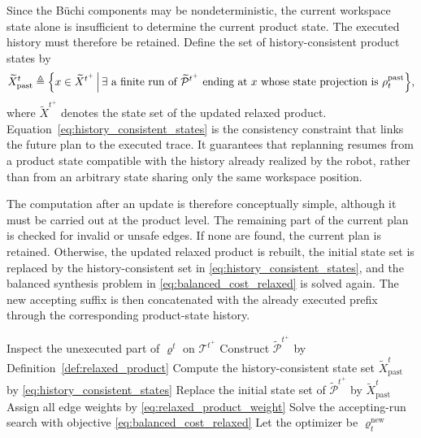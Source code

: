 Since the B\"uchi components may be nondeterministic, the current workspace
state alone is insufficient to determine the current product state. The
executed history must therefore be retained. Define the set of
history-consistent product states by
\begin{equation}
\widetilde{X}^{t}_{\mathrm{past}} \triangleq
\Bigl\{x \in \widetilde{X}^{t^+} \, \Big| \,
\exists\text{ a finite run of } \widetilde{\mathcal{P}}^{t^+}
\text{ ending at } x
\text{ whose state projection is }
\rho^{\mathrm{past}}_{t}\Bigr\},
\label{eq:history_consistent_states}
\end{equation}
where $\widetilde{X}^{t^+}$ denotes the state set of the updated relaxed
product. Equation~\eqref{eq:history_consistent_states} is the consistency
constraint that links the future plan to the executed trace. It guarantees that
replanning resumes from a product state compatible with the history already
realized by the robot, rather than from an arbitrary state sharing only the same
workspace position.

The computation after an update is therefore conceptually simple, although it
must be carried out at the product level. The remaining part of the current plan
is checked for invalid or unsafe edges. If none are found, the current plan is
retained. Otherwise, the updated relaxed product is rebuilt, the initial state
set is replaced by the history-consistent set in
\eqref{eq:history_consistent_states}, and the balanced synthesis problem in
\eqref{eq:balanced_cost_relaxed} is solved again. The new accepting suffix is
then concatenated with the already executed prefix through the corresponding
product-state history.

\begin{algorithm}[t]
\caption{History-aware revision under workspace updates}
\label{alg:history_revision}
\DontPrintSemicolon
{}
Inspect the unexecuted part of $\varrho^{t}$ on $\mathcal{T}^{t^+}$\;
Construct $\widetilde{\mathcal{P}}^{t^+}$ by
Definition~\ref{def:relaxed_product}\;
Compute the history-consistent state set
$\widetilde{X}^{t}_{\mathrm{past}}$ by
\eqref{eq:history_consistent_states}\;
Replace the initial state set of $\widetilde{\mathcal{P}}^{t^+}$ by
$\widetilde{X}^{t}_{\mathrm{past}}$\;
Assign all edge weights by \eqref{eq:relaxed_product_weight}\;
Solve the accepting-run search with objective
\eqref{eq:balanced_cost_relaxed}\;
Let the optimizer be $\varrho^{\mathrm{new}}_{t}$\;
\;
\end{algorithm}

